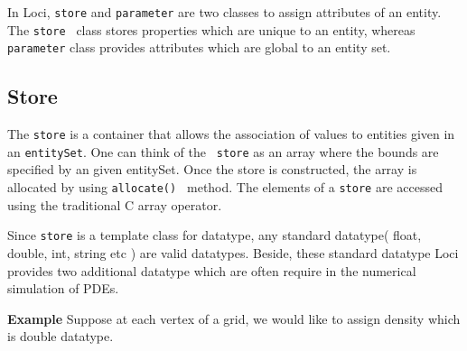 \par In Loci, {\tt store} and {\tt parameter} are two classes to assign
attributes of an entity. The {\tt store } class stores properties which
are unique to an entity, whereas {\tt parameter} class provides attributes
which are global to an entity set.

\subsection{Store}
The {\tt store} is a container that allows the association of values
to entities given in an {\tt entitySet}.  One can think of the {\tt
store} as an array where the bounds are specified by an given
entitySet.  Once the store is constructed, the array is allocated by
using {\tt allocate() } method. The elements of a {\tt store} are 
accessed using the traditional C array operator. 

\par Since {\tt store} is a template class for datatype, any standard datatype( 
float, double, int, string etc ) are valid datatypes. Beside, these standard datatype
Loci provides two additional datatype which are often require in the numerical simulation
of PDEs.

\par {\bf Example} Suppose at each vertex of a grid, we would like to assign density which
is double datatype. 

